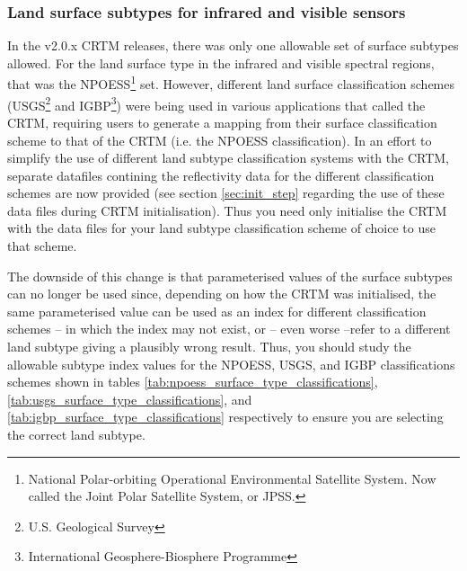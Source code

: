\subsubsection{Land surface subtypes for infrared and visible sensors}

In the v2.0.x CRTM releases, there was only one allowable set of surface subtypes allowed. For the land surface type in the infrared and visible spectral regions, that was the NPOESS\footnote{National Polar-orbiting Operational Environmental Satellite System. Now called the Joint Polar Satellite System, or JPSS.} set. However, different land surface classification schemes (USGS\footnote{U.S. Geological Survey} and IGBP\footnote{International Geosphere-Biosphere Programme}) were being used in various applications that called the CRTM, requiring users to generate a mapping from their surface classification scheme to that of the CRTM (i.e. the NPOESS classification). In an effort to simplify the use of different land subtype classification systems with the CRTM, separate datafiles contining the reflectivity data for the different classification schemes are now provided (see section \ref{sec:init_step} regarding the use of these data files during CRTM initialisation). Thus you need only initialise the CRTM with the data files for your land subtype classification scheme of choice to use that scheme.

The downside of this change is that parameterised values of the surface subtypes can no longer be used since, depending on how the CRTM was initialised, the same parameterised value can be used as an index for different classification schemes -- in which the index may not exist, or -- even worse --refer to a different land subtype giving a plausibly wrong result. Thus, you should study the allowable subtype index values for the NPOESS, USGS, and IGBP classifications schemes shown in tables \ref{tab:npoess_surface_type_classifications}, \ref{tab:usgs_surface_type_classifications}, and \ref{tab:igbp_surface_type_classifications} respectively to ensure you are selecting the correct land subtype.

